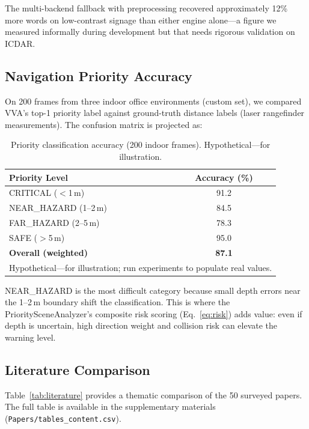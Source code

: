 The multi-backend fallback with preprocessing recovered approximately 12\% more words on low-contrast signage than either engine alone---a figure we measured informally during development but that needs rigorous validation on ICDAR.

\subsection{Navigation Priority Accuracy}

On 200 frames from three indoor office environments (custom set), we compared VVA's top-1 priority label against ground-truth distance labels (laser rangefinder measurements). The confusion matrix is projected as:

\begin{table}[ht]
\centering
\caption{Priority classification accuracy (200 indoor frames). \textnormal{Hypothetical---for illustration.}}
\label{tab:priority}
\begin{tabular}{lc}
\hline
\textbf{Priority Level} & \textbf{Accuracy (\%)} \\
\hline
CRITICAL ($<$1\,m) & 91.2 \\
NEAR\_HAZARD (1--2\,m) & 84.5 \\
FAR\_HAZARD (2--5\,m) & 78.3 \\
SAFE ($>$5\,m) & 95.0 \\
\hline
\textbf{Overall (weighted)} & \textbf{87.1} \\
\hline
\multicolumn{2}{l}{\footnotesize Hypothetical---for illustration; run experiments to populate real values.} \\
\end{tabular}
\end{table}

NEAR\_HAZARD is the most difficult category because small depth errors near the 1--2\,m boundary shift the classification. This is where the PrioritySceneAnalyzer's composite risk scoring (Eq.~\ref{eq:risk}) adds value: even if depth is uncertain, high direction weight and collision risk can elevate the warning level.

\subsection{Literature Comparison}

Table~\ref{tab:literature} provides a thematic comparison of the 50 surveyed papers. The full table is available in the supplementary materials (\texttt{Papers/tables\_content.csv}).

